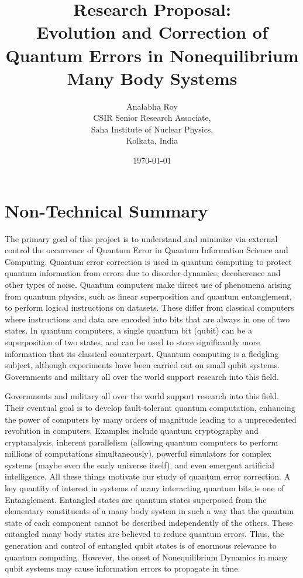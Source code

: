 \documentclass[a4paper,9pt]{article}
\title{Research Proposal:\\ Evolution and Correction of Quantum Errors in Nonequilibrium Many Body Systems }
\author{Analabha Roy\\CSIR Senior Research Associate,\\ Saha Institute of Nuclear Physics,\\ Kolkata, India}
\date{\today}
\begin{document}
 \maketitle
\section{Non-Technical Summary}
The primary goal of this project is to understand and minimize via external control the occurrence of Quantum Error in Quantum Information Science and Computing. Quantum error correction is used in quantum computing to protect quantum information from errors due to disorder-dynamics, decoherence and other types of noise. Quantum computers make direct use of phenomena arising from quantum physics, such as linear superposition and quantum entanglement, to perform logical instructions on datasets. These differ from classical computers where instructions and data are encoded into bits that are always in one of two states. In quantum computers, a single quantum bit (qubit) can be a superposition of two states, and can be used to store significantly more information that its classical counterpart. Quantum computing is a fledgling subject, although experiments have been carried out on small qubit systems. Governments and military all over the world support research into this field. 

Governments and military all over the world support research into this field. Their eventual goal is to develop fault-tolerant quantum computation, enhancing the power of computers by many orders of magnitude leading to a unprecedented revolution in computers. Examples include quantum cryptography and cryptanalysis, inherent parallelism (allowing quantum computers to perform millions of computations simultaneously), powerful simulators for complex systems (maybe even the early universe itself), and even emergent artificial intelligence. All these things motivate our study of quantum error correction. A key quantity of interest in systems of many interacting quantum bits is one of Entanglement. Entangled states are quantum states superposed from the elementary constituents of a many body system in such a way that the quantum state of each component cannot be described independently of the others. These entangled many body states are believed to reduce quantum errors.  Thus, the generation and control of entangled qubit states is of enormous relevance to quantum computing. However, the onset of Nonequilibrium Dynamics in many qubit systems may cause information errors to propagate in time.
\end{document}
